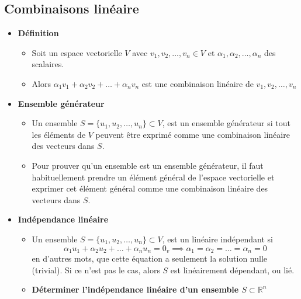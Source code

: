 \subsection*{Combinaisons linéaire}
\begin{itemize}
    \item[] \textbf{Définition} \begin{itemize}
              \item[] Soit un espace vectorielle $V$ avec $v_1, v_2, \ldots, v_n \in V$ et $\alpha_1, \alpha_2, \ldots, \alpha_n$ des scalaires.
              \item[] Alors $\alpha_1 v_1 + \alpha_2 v_2 + \ldots + \alpha_n v_n$ est une combinaison linéaire de
                    $v_1, v_2, \ldots, v_n$
          \end{itemize}
    \item[] \textbf{Ensemble générateur} \begin{itemize}
              \item[] Un ensemble $S = \{ u_1, u_2, \ldots, u_n \} \subset V$, est un ensemble générateur
                    si tout les éléments de $V$ peuvent être exprimé comme une combinaison linéaire des vecteurs
                    dans $S$.
              \item[] Pour prouver qu'un ensemble est un ensemble générateur, il faut habituellement
                    prendre un élément général de l'espace vectorielle et exprimer cet élément général
                    comme une combinaison linéaire des vecteurs dans $S$.
          \end{itemize}
    \item[] \textbf{Indépendance linéaire} \begin{itemize}
              \item[] Un ensemble $S = \{ u_1, u_2, \ldots, u_n \} \subset V$, est un linéaire indépendant
                    si \begin{equation*}
                        \alpha_1 u_1 + \alpha_2 u_2 + \ldots + \alpha_n u_n = 0_v \implies \alpha_1 = \alpha_2 = \ldots = \alpha_n = 0
                    \end{equation*}
                    en d'autres mots, que cette équation a seulement la solution nulle (trivial). Si
                    ce n'est pas le cas, alors $S$ est linéairement dépendant, ou lié.
              \item[] \textbf{Déterminer l'indépendance linéaire d'un ensemble $S \subset \mathbb{R}^n$} \begin{enumerate}[1), itemsep = 0.5em]

\end{enumerate}
\end{itemize}
\end{itemize}
